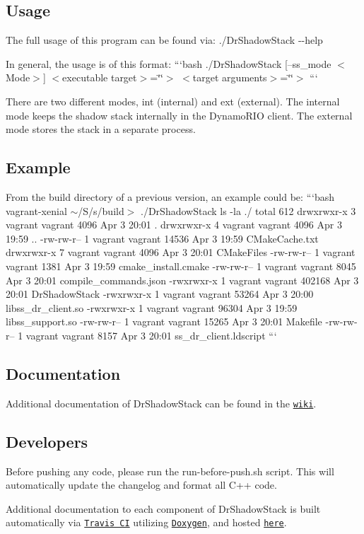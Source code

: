 \subsection*{Usage}

The full usage of this program can be found via\-: {\ttfamily ./\-Dr\-Shadow\-Stack -\/-\/help}

In general, the usage is of this format\-: ```bash ./\-Dr\-Shadow\-Stack \mbox{[}--ss\-\_\-mode $<$\-Mode$>$\mbox{]} $<$executable target$>$=\char`\"{}\char`\"{}$>$ $<$target arguments$>$=\char`\"{}\char`\"{}$>$ ```

There are two different modes, {\ttfamily int} (internal) and {\ttfamily ext} (external). The internal mode keeps the shadow stack internally in the Dynamo\-R\-I\-O client. The external mode stores the stack in a separate process.

\subsection*{Example}

From the build directory of a previous version, an example could be\-: ```bash vagrant-\/xenial $\sim$/\-S/s/build$>$ ./\-Dr\-Shadow\-Stack ls -\/la ./ total 612 drwxrwxr-\/x 3 vagrant vagrant 4096 Apr 3 20\-:01 . drwxrwxr-\/x 4 vagrant vagrant 4096 Apr 3 19\-:59 .. -\/rw-\/rw-\/r-- 1 vagrant vagrant 14536 Apr 3 19\-:59 C\-Make\-Cache.\-txt drwxrwxr-\/x 7 vagrant vagrant 4096 Apr 3 20\-:01 C\-Make\-Files -\/rw-\/rw-\/r-- 1 vagrant vagrant 1381 Apr 3 19\-:59 cmake\-\_\-install.\-cmake -\/rw-\/rw-\/r-- 1 vagrant vagrant 8045 Apr 3 20\-:01 compile\-\_\-commands.\-json -\/rwxrwxr-\/x 1 vagrant vagrant 402168 Apr 3 20\-:01 Dr\-Shadow\-Stack -\/rwxrwxr-\/x 1 vagrant vagrant 53264 Apr 3 20\-:00 libss\-\_\-dr\-\_\-client.\-so -\/rwxrwxr-\/x 1 vagrant vagrant 96304 Apr 3 19\-:59 libss\-\_\-support.\-so -\/rw-\/rw-\/r-- 1 vagrant vagrant 15265 Apr 3 20\-:01 Makefile -\/rw-\/rw-\/r-- 1 vagrant vagrant 8157 Apr 3 20\-:01 ss\-\_\-dr\-\_\-client.\-ldscript ```

\subsection*{Documentation}

Additional documentation of Dr\-Shadow\-Stack can be found in the \href{https://github.com/zwimer/DrShadowStack/wiki}{\tt wiki}.

\subsection*{Developers}

Before pushing any code, please run the {\ttfamily run-\/before-\/push.\-sh} script. This will automatically update the changelog and format all {\ttfamily C++} code.

Additional documentation to each component of Dr\-Shadow\-Stack is built automatically via \href{https://travis-ci.org/}{\tt Travis C\-I} utilizing \href{http://www.stack.nl/~dimitri/doxygen/}{\tt Doxygen}, and hosted \href{https://zwimer.com/DrShadowStack}{\tt here}. 